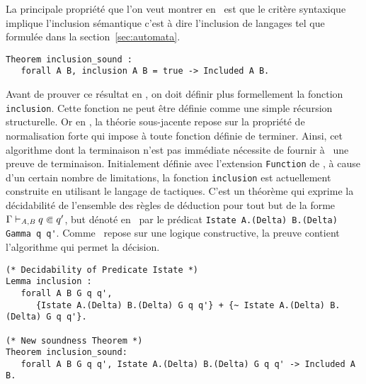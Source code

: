 
La principale propriété que l'on veut montrer en \coq\ est que le critère syntaxique
implique l'inclusion sémantique c'est à dire l'inclusion de langages tel que formulée
dans la section~\ref{sec:automata}.

\begin{lstlisting}
Theorem inclusion_sound :
   forall A B, inclusion A B = true -> Included A B.
\end{lstlisting}

Avant de prouver ce résultat en \coq, on doit définir plus formellement la fonction
\lstinline!inclusion!. Cette fonction ne peut être définie comme une simple récursion structurelle.
Or en \coq, la théorie sous-jacente repose sur la propriété de normalisation forte qui impose à toute
fonction définie de terminer. Ainsi, cet algorithme dont la terminaison n'est pas immédiate
nécessite de fournir à \coq\ une preuve de terminaison.
Initialement définie avec l'extension \lstinline!Function! de \coq, à cause d'un certain nombre de limitations,
la fonction \lstinline!inclusion! est actuellement construite en utilisant le langage de tactiques. C'est un théorème
qui exprime la décidabilité de l'ensemble des règles de déduction pour tout but de la forme $\Gamma \vdash_{\mathit A, \mathit B} q \Subset q'$,
but dénoté en \coq\ par le prédicat \lstinline!Istate A.(Delta) B.(Delta) Gamma q q'!. Comme \coq\ repose sur une logique constructive,
la preuve contient l'algorithme qui permet la décision.

\begin{lstlisting}
(* Decidability of Predicate Istate *)
Lemma inclusion :
   forall A B G q q',
      {Istate A.(Delta) B.(Delta) G q q'} + {~ Istate A.(Delta) B.(Delta) G q q'}.

(* New soundness Theorem *)
Theorem inclusion_sound:
   forall A B G q q', Istate A.(Delta) B.(Delta) G q q' -> Included A B.
\end{lstlisting}

